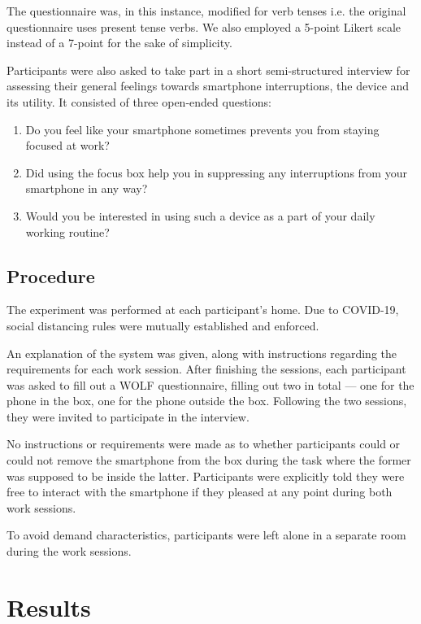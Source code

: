 \documentclass[format=acmsmall]{acmart}
\begin{document}
The questionnaire was, in this instance, modified for verb tenses i.e. the original questionnaire uses present tense verbs. We also employed a 5-point Likert scale instead of a 7-point for the sake of simplicity.

Participants were also asked to take part in a short semi-structured interview for assessing their general feelings towards smartphone interruptions, the device and its utility. It consisted of three open-ended questions:

\begin{enumerate}
    \item Do you feel like your smartphone sometimes prevents you from staying focused at work?
    \item Did using the focus box help you in suppressing any interruptions from your smartphone in any way?
    \item Would you be interested in using such a device as a part of your daily working routine?
\end{enumerate}

\subsection{Procedure}

The experiment was performed at each participant's home. Due to COVID-19, social distancing rules were mutually established and enforced.

An explanation of the system was given, along with instructions regarding the requirements for each work session. After finishing the sessions, each participant was asked to fill out a WOLF questionnaire, filling out two in total --- one for the phone in the box, one for the phone outside the box. Following the two sessions, they were invited to participate in the interview.

No instructions or requirements were made as to whether participants could or could not remove the smartphone from the box during the task where the former was supposed to be inside the latter. Participants were explicitly told they were free to interact with the smartphone if they pleased at any point during both work sessions.

To avoid demand characteristics, participants were left alone in a separate room during the work sessions. 

\section{Results}
\end{document}
